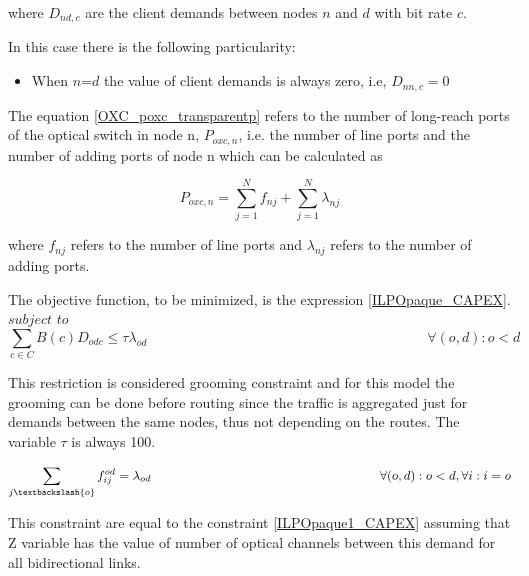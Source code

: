 \vspace{11pt}
where $D_{nd,c}$ are the client demands between nodes $n$ and $d$ with bit rate $c$.

\vspace{11pt}
In this case there is the following particularity:

\begin{itemize}
  \item When $n$=$d$ the value of client demands is always zero, i.e, $D_{nn,c}=0$
\end{itemize}

\vspace{11pt}
The equation \ref{OXC_poxc_transparentp} refers to the number of long-reach ports of the optical switch in node n, $P_{oxc,n}$, i.e. the number of line ports and the number of adding ports of node n which can be calculated as

\begin{equation}
P_{oxc,n} = \sum_{j=1}^{N} f_{nj} + \sum_{j=1}^{N} \lambda_{nj}
\label{OXC_poxc_transparentp}
\end{equation}

\vspace{11pt}
where $f_{nj}$ refers to the number of line ports and $\lambda_{nj}$ refers to the number of adding ports.

\vspace{17pt}
The objective function, to be minimized, is the expression \ref{ILPOpaque_CAPEX}.\\

$subject$ $to$
\begin{equation}
\sum_{c\in C} B\left(c\right) D_{odc} \leq \tau \lambda_{od} \qquad \qquad \qquad \qquad \qquad \qquad \qquad \qquad \qquad \qquad
\forall(o,d) : o < d
\label{ILPTransp0}
\end{equation}

This restriction is considered grooming constraint and for this model the grooming can be done before routing since the traffic is aggregated just for demands between the same nodes, thus not depending on the routes. The variable  $\tau$ is always 100.

\begin{equation}
\sum_{j\textbackslash \{o\}} f_{ij}^{od} = \lambda_{od} \qquad \qquad \qquad \qquad \qquad \qquad \qquad \qquad \qquad
\forall(o,d) : o < d, \forall i: i = o
\label{ILPTransp1}
\end{equation}

This constraint are equal to the constraint \ref{ILPOpaque1_CAPEX} assuming that Z variable has the value of number of optical channels between this demand for all bidirectional links.


